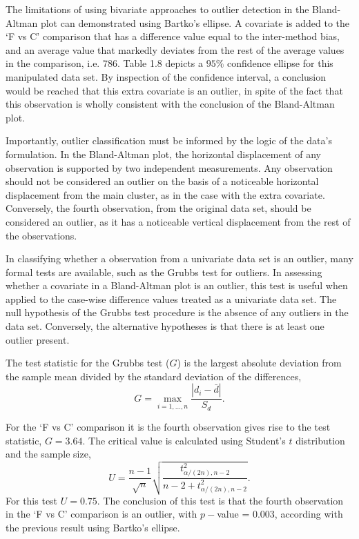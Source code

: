 \documentclass[Chap2bmain.tex]{subfiles}
\begin{document}
The limitations of using bivariate approaches to outlier detection
in the Bland-Altman plot can demonstrated using Bartko's ellipse.
A covariate is added to the `F vs C' comparison that has a
difference value equal to the inter-method bias, and an average
value that markedly deviates from the rest of the average values
in the comparison, i.e. 786. Table 1.8 depicts a $95\%$ confidence
ellipse for this manipulated data set. By inspection of the
confidence interval, a conclusion would be reached that this extra
covariate is an outlier, in spite of the fact that this
observation is wholly consistent with the conclusion of the
Bland-Altman plot.



Importantly, outlier classification must be informed by the logic of the
data's formulation. In the Bland-Altman plot, the horizontal displacement of any
observation is supported by two independent measurements. Any
observation should not be considered an outlier on the basis of a
noticeable horizontal displacement from the main cluster, as in
the case with the extra covariate. Conversely, the fourth
observation, from the original data set, should be considered an
outlier, as it has a noticeable vertical displacement from the
rest of the observations.



In classifying whether a observation from a univariate data set is
an outlier, many formal tests are available, such as the Grubbs test for outliers. In assessing
whether a covariate in a Bland-Altman plot is an outlier, this
test is useful when applied to the case-wise difference values treated as a
univariate data set. The null hypothesis of the Grubbs test procedure is the absence
of any outliers in the data set. Conversely, the alternative hypotheses is that there is at least one outlier
present.

The test statistic for the Grubbs test ($G$) is the largest
absolute deviation from the sample mean divided by the standard
deviation of the differences,
\[
G =  \displaystyle\max_{i=1,\ldots, n}\frac{\left \vert d_i -
\bar{d}\right\vert}{S_{d}}.
\]

For the `F vs C' comparison it is the fourth observation gives
rise to the test statistic, $G = 3.64$. The critical value is
calculated using Student's $t$ distribution and the sample size,
\[
U = \frac{n-1}{\sqrt{n}} \sqrt{\frac{t_{\alpha/(2n),n-2}^2}{n - 2
+ t_{\alpha/(2n),n-2}^2}}.
\]
For this test $U = 0.75$. The conclusion of this test is that the fourth observation in the `F vs C' comparison is an outlier, with $p-$value = 0.003, according with the previous result using Bartko's ellipse.
\end{document}
